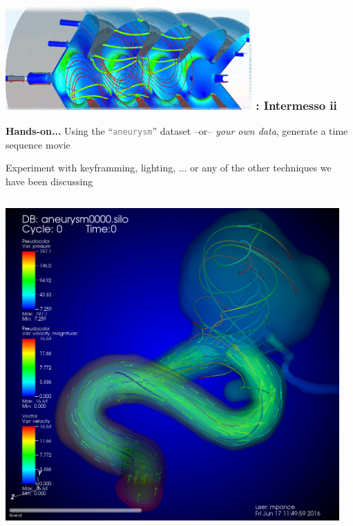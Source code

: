 \handsonEnv
\begin{frame}
\frametitle{\href{https://wci.llnl.gov/simulation/computer-codes/visit/}{\includegraphics[height=.85cm]{figs/visit-logos/VisIt-02}} \hspace{-.85cm}{\bf \textcolor{lightgray}{VisIt}}: Intermesso ii}

\begin{beamerboxesrounded}[upper=block head,lower=block body,shadow=true]{\bf Hands-on...}%
        \textcolor{DarkGreen}{} Using the 
                {\small ``\textcolor{gray}{\texttt{aneurysm}}''} dataset
                --or-- \textit{your own data},
		generate a time sequence movie

	\pause
        \textcolor{DarkGreen}{} Experiment with keyframming, lighting, ... or any of the other techniques we have been discussing

\end{beamerboxesrounded}

\pause
\vspace{2mm}
\begin{columns}
\begin{column}{5cm}
	\includegraphics[width=\columnwidth]{figs/visit-pract/VisIt_aneurysm0}
\end{column}
\begin{column}{6cm}
\end{column}
\end{columns}
\end{frame}

\resetEnv
\basicEnv
